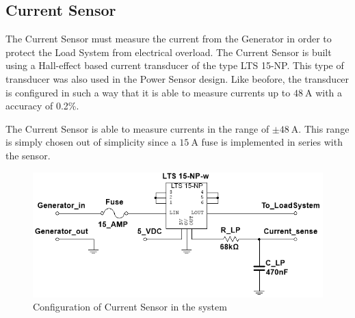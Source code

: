 \subsection{Current Sensor}
The Current Sensor must measure the current from the Generator in order to protect the Load System from electrical overload. The Current Sensor is built using a Hall-effect based current transducer of the type LTS 15-NP. This type of transducer was also used in the Power Sensor design. Like beofore, the transducer is configured in such a way that it is able to measure currents up to $\SI{48}{\ampere}$ with a accuracy of 0.2\%.

The Current Sensor is able to measure currents in the range of $\pm \SI{48}{\ampere}$. This range is simply chosen out of simplicity since a $\SI{15}{\ampere}$ fuse is implemented in series with the sensor.

\begin{figure}[H]
	\centering
	\includegraphics[width=0.8\linewidth]{Hardware/LoadSystem/CurrentSensor}
	\caption{Configuration of Current Sensor in the system}
	\label{fig:CurrentSensorCircuit}
\end{figure}